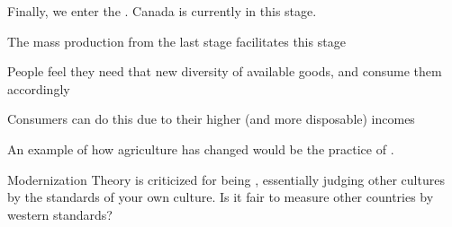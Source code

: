 Finally, we enter the . Canada is currently in this stage.
\begin{bullets}
	\item The mass production from the last stage facilitates this stage
	\item People feel they need that new diversity of available goods, and consume them accordingly
	\item Consumers can do this due to their higher (and more disposable) incomes
\end{bullets}

An example of how agriculture has changed would be the practice of .

Modernization Theory is criticized for being , essentially judging other cultures by the standards of your own culture. Is it fair to measure other countries by western standards?